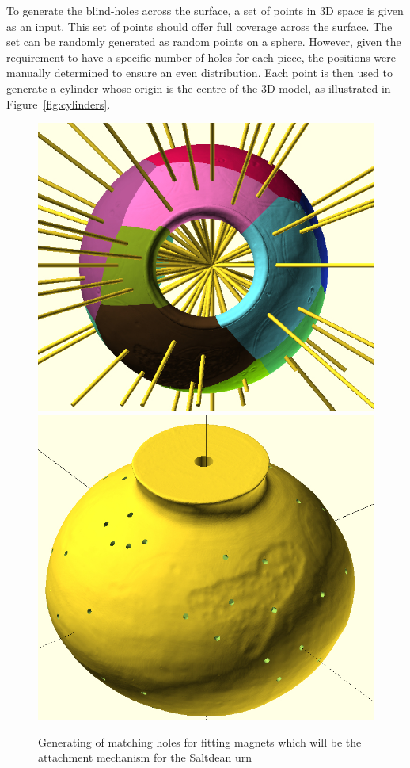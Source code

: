 \documentclass[acmlarge,screen,dvipsnames]{acmart}
\begin{document}
To generate the blind-holes across the surface, a set of points in 3D
space is given as an input. This set of points should offer full
coverage across the surface. The set can be randomly generated as
random points on a sphere. However, given the requirement to have a
specific number of holes for each piece, the positions were manually
determined to ensure an even distribution. Each point is then used to
generate a cylinder whose origin is the centre of the 3D model, as
illustrated in Figure~\ref{fig:cylinders}.
%
\begin{figure}[H]
  \centering
  {\includegraphics[width=0.45\linewidth]{images/allcylinders.jpg}}
  {\includegraphics[width=0.45\linewidth]{images/coreholes.jpg}}
 \caption{Generating of matching holes for fitting magnets which will be the attachment mechanism for the Saltdean urn}
\end{figure}
\end{document}
